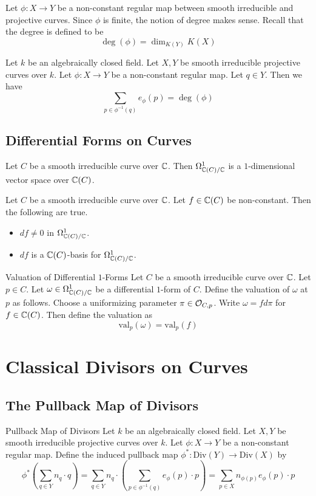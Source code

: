 \documentclass[a4paper]{article}
\begin{document}
Let $\phi:X\to Y$ be a non-constant regular map between smooth irreducible and projective curves. Since $\phi$ is finite, the notion of degree makes sense. Recall that the degree is defined to be $$\deg(\phi)=\dim_{K(Y)}K(X)$$

\begin{prp}{}{} Let $k$ be an algebraically closed field. Let $X,Y$ be smooth irreducible projective curves over $k$. Let $\phi:X\to Y$ be a non-constant regular map. Let $q\in Y$. Then we have $$\sum_{p\in\phi^{-1}(q)}e_\phi(p)=\deg(\phi)$$
\end{prp}

\subsection{Differential Forms on Curves}
\begin{prp}{}{} Let $C$ be a smooth irreducible curve over $\mathbb{C}$. Then $\Omega_{\mathbb{C}(C)/\mathbb{C}}^1$ is a $1$-dimensional vector space over $\mathbb{C}(C)$. 
\end{prp}

\begin{prp}{}{} Let $C$ be a smooth irreducible curve over $\mathbb{C}$. Let $f\in\mathbb{C}(C)$ be non-constant. Then the following are true. 
\begin{itemize}
\item $df\neq 0$ in $\Omega_{\mathbb{C}(C)/\mathbb{C}}^1$. 
\item $df$ is a $\mathbb{C}(C)$-basis for $\Omega_{\mathbb{C}(C)/\mathbb{C}}^1$. 
\end{itemize}
\end{prp}

\begin{defn}{Valuation of Differential $1$-Forms}{} Let $C$ be a smooth irreducible curve over $\mathbb{C}$. Let $p\in C$. Let $\omega\in\Omega_{\mathbb{C}(C)/\mathbb{C}}^1$ be a differential $1$-form of $C$. Define the valuation of $\omega$ at $p$ as follows. Choose a uniformizing parameter $\pi\in\mathcal{O}_{C,p}$. Write $\omega=fd\pi$ for $f\in\mathbb{C}(C)$. Then define the valuation as $$\text{val}_p(\omega)=\text{val}_p(f)$$
\end{defn}

\pagebreak
\section{Classical Divisors on Curves}
\subsection{The Pullback Map of Divisors}
\begin{defn}{Pullback Map of Divisors}{} Let $k$ be an algebraically closed field. Let $X,Y$ be smooth irreducible projective curves over $k$. Let $\phi:X\to Y$ be a non-constant regular map. Define the induced pullback map $\phi^\ast:\text{Div}(Y)\to\text{Div}(X)$ by $$\phi^\ast\left(\sum_{q\in Y} n_q\cdot q\right)=\sum_{q\in Y}n_q\cdot\left(\sum_{p\in\phi^{-1}(q)}e_\phi(p)\cdot p\right)=\sum_{p\in X}n_{\phi(p)}e_\phi(p)\cdot p$$
\end{defn}
\end{document}
